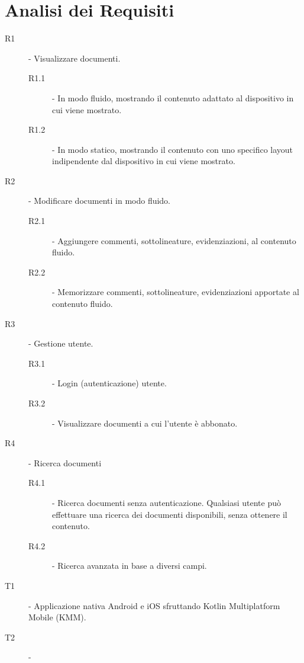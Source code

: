 \section{Analisi dei Requisiti}
\begin{description}
    \item[R1] - Visualizzare documenti.
    \begin{description}
        \item[R1.1] - In modo fluido, mostrando il contenuto adattato al dispositivo in cui viene mostrato.
        \item[R1.2] - In modo statico, mostrando il contenuto con uno specifico layout indipendente dal dispositivo in cui viene mostrato.
    \end{description}
    \item[R2] - Modificare documenti in modo fluido.
    \begin{description}
        \item[R2.1] - Aggiungere commenti, sottolineature, evidenziazioni, al contenuto fluido.
        \item[R2.2] - Memorizzare commenti, sottolineature, evidenziazioni apportate al contenuto fluido.
    \end{description}
    \item[R3] - Gestione utente.
    \begin{description}
        \item[R3.1] - Login (autenticazione) utente.
        \item[R3.2] - Visualizzare documenti a cui l'utente è abbonato.
    \end{description}
    \item[R4] - Ricerca documenti
    \begin{description}
        \item[R4.1] - Ricerca documenti senza autenticazione. Qualsiasi utente può effettuare una ricerca dei documenti disponibili, senza ottenere il contenuto.
        \item[R4.2] - Ricerca avanzata in base a diversi campi. %
    \end{description}
    
\end{description}


\begin{description}
    \item[T1] - Applicazione nativa Android e iOS sfruttando Kotlin Multiplatform Mobile (KMM).
    \item[T2] - 
\end{description}
